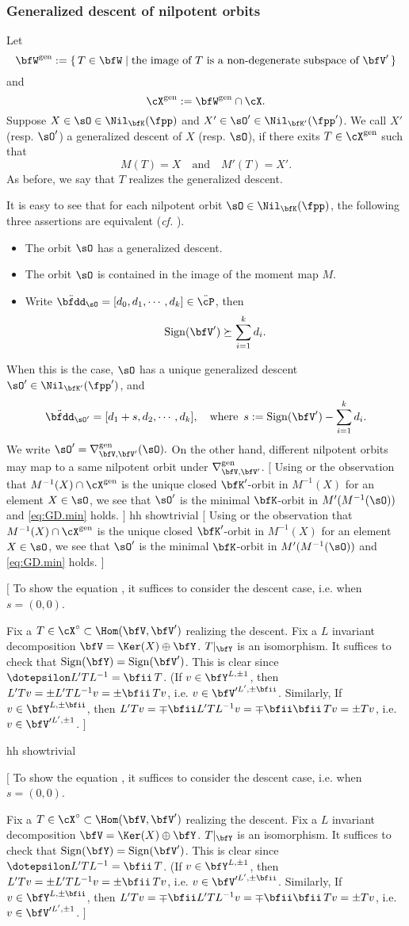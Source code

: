 \documentclass[12pt,a4paper]{amsart}
\newcommand{\trivial}[2][]{\if\relax\detokenize{#1}\relax
  {%
      \color{orange} \vspace{0em} $[$  #2 $]$
      \color{black}
  }
  \else
\ifx#1h
\ifcsname showtrivial\endcsname
{%
    \color{orange} \vspace{0em}  $[$ #2 $]$
    \color{black}
}
\fi
\else {\red Wrong argument!} \fi
\fi
}
\def\gDD{\nabla^{\mathrm{gen}}}
\numberwithin{equation}{section}
\theoremstyle{remark}
\newtheorem*{remark}{Remark}
\def\MMP{M}
\def\bfWg{\bfW^{\mathrm{gen}}}
\def\Xg{\cX^{\mathrm{gen}}}
\def\ssP{{\ddot\cP}}
\def\ssdd{\ddot{\bfdd}}
\begin{document}

\subsubsection{Generalized descent of nilpotent orbits}
\label{def:GD}
Let
\[
\bfWg := \set{T \in \bfW| \text{the image of $T$ is a
      non-degenerate subspace of $\bfV'$}}
\]
and
\[
  \Xg:= \bfWg\cap \cX.
\]
Suppose $X\in \sO \in \Nil_{\bfK}(\fpp)$ and
$X'\in \sO' \in \Nil_{\bfK'}(\fpp')$.  We call $X'$ (resp. $\sO'$) a
generalized descent of $X$ (resp. $\sO$), if there exits
$T\in \Xg$ such that
$$
\MMP(T) = X\quad\textrm{and}\quad \MMP'(T) = X'.
$$
As before, we say that $T$ realizes the generalized descent.

 It is easy to see that for each  nilpotent orbit $\sO\in \Nil_{\bfK}(\fpp)$,
 the following three assertions are equivalent (\emph{cf.} \cite[Table~4]{DKP2}).
 \begin{itemize}
 \item
   The orbit $\sO$ has a generalized descent.
   \item
  The orbit  $\sO$ is contained in the image of the moment map $M$.
  \item
  Write $\ssdd_\sO = [d_0, d_1, \cdots, d_k]\in \ssP$, then
  $$\sign{\bfV'}  \succeq \sum_{i=1}^{k} d_i.$$
  \end{itemize}
  When this is the case,   $\sO$ has a unique generalized
descent $\sO'\in \Nil_{\bfK'}(\fpp')$, and
  \begin{equation}\label{eq:GD}
\ssdd_{\sO'} = [d_{1}+s, d_{2}, \cdots, d_k], \quad \textrm{where } \, s:= \sign{\bfV'} - \sum_{i=1}^{k} d_i.
\end{equation}
We write $\sO' = \gDD_{\bfV,\bfV'}(\sO).$ On the other hand, different nilpotent
orbits may map to a same nilpotent orbit under $\gDD_{\bfV,\bfV'}$.
\trivial[h]{
Using  \cite[Table~4]{DKP2} or the observation that $M^{-1}(X)\cap \Xg$ is the
unique closed
$\bfK'$-orbit in $M^{-1}(X)$ for an element $X\in \sO$, we see that
$\sO'$ is the minimal
$\bfK$-orbit in $M'(M^{-1}(\sO))$ and \cref{eq:GD.min} holds.
}
\trivial[h]{
To show the equation , it suffices to consider the descent case,
i.e. when $s = (0,0)$.

Fix a $T\in \cX^\circ \subset \Hom(\bfV,\bfV')$ realizing the descent.
Fix a $L$ invariant decomposition $\bfV = \Ker(X) \oplus \bfY$. $T|_\bfY$ is an
isomorphism.
It suffices to check that $\sign{\bfY} = \sign{\bfV'}$.
This is clear since $\dotepsilon L' T L^{-1}  = \bfii\, T$.  (If $v\in
\bfY^{L, \pm 1}$, then $L' T v = \pm L' T  L^{-1} v = \pm \bfii\, Tv$,
i.e. $v\in \bfV'^{L', \pm \bfii}$. Similarly, If $v\in
\bfY^{L, \pm \bfii}$, then $L' T v = \mp\bfii L' T  L^{-1} v = \mp\bfii \bfii\,
Tv = \pm Tv$,
i.e. $v\in \bfV'^{L', \pm 1}$.
}
\end{document}
